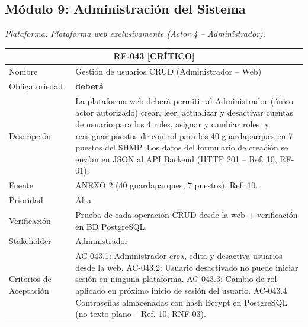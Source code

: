 \documentclass[12pt, a4paper]{article}
\newcommand{\criticomark}{\textcolor{criticolor}{\textbf{[CR\'ITICO]}}}
\begin{document}
\subsection{M\'odulo 9: Administraci\'on del Sistema}

\textit{Plataforma: Plataforma web exclusivamente (Actor 4 -- Administrador).}

\begin{longtable}{|p{3cm}|p{11.5cm}|}
\hline
\multicolumn{2}{|c|}{\textbf{RF-043} \criticomark} \\
\hline
Nombre & Gesti\'on de usuarios CRUD (Administrador -- Web) \\
\hline
Obligatoriedad & \textbf{deber\'a} \\
\hline
Descripci\'on & La plataforma web deber\'a permitir al Administrador (\'unico actor autorizado) crear, leer, actualizar y desactivar cuentas de usuario para los 4 roles, asignar y cambiar roles, y reasignar puestos de control para los 40 guardaparques en 7 puestos del SHMP. Los datos del formulario de creaci\'on se env\'ian en JSON al API Backend (HTTP 201 -- Ref. 10, RF-01). \\
\hline
Fuente & ANEXO 2 (40 guardaparques, 7 puestos). Ref. 10. \\
\hline
Prioridad & Alta \\
\hline
Verificaci\'on & Prueba de cada operaci\'on CRUD desde la web + verificaci\'on en BD PostgreSQL. \\
\hline
Stakeholder & Administrador \\
\hline
Criterios de Aceptaci\'on &
AC-043.1: Administrador crea, edita y desactiva usuarios desde la web. \newline
AC-043.2: Usuario desactivado no puede iniciar sesi\'on en ninguna plataforma. \newline
AC-043.3: Cambio de rol aplicado en pr\'oximo inicio de sesi\'on del usuario. \newline
AC-043.4: Contrase\~nas almacenadas con hash Bcrypt en PostgreSQL (no texto plano -- Ref. 10, RNF-03). \\
\hline
\end{longtable}
\end{document}
